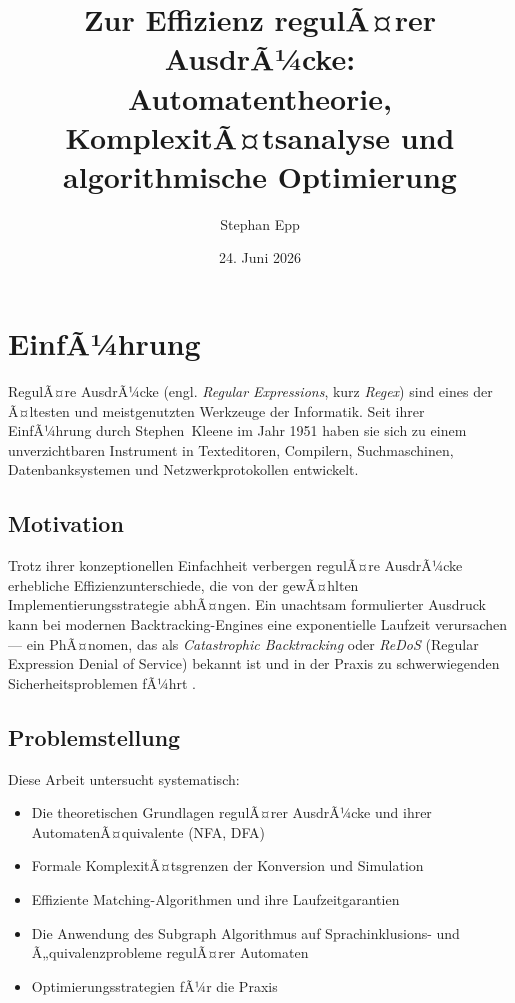 ﻿\documentclass[a4paper,12pt]{article}
\title{Zur Effizienz regulÃ¤rer AusdrÃ¼cke:\\
Automatentheorie, KomplexitÃ¤tsanalyse und\\
algorithmische Optimierung}
\author{Stephan Epp}
\date{24. Juni 2026}
\theoremstyle{definition}
\begin{document}
\maketitle
\tableofcontents
\newpage

\section{EinfÃ¼hrung}

RegulÃ¤re AusdrÃ¼cke (engl. \emph{Regular Expressions}, kurz \emph{Regex}) sind
eines der Ã¤ltesten und meistgenutzten Werkzeuge der Informatik. Seit ihrer
EinfÃ¼hrung durch Stephen~Kleene im Jahr 1951 \cite{kleene1951} haben sie sich zu
einem unverzichtbaren Instrument in Texteditoren, Compilern, Suchmaschinen,
Datenbanksystemen und Netzwerkprotokollen entwickelt.

\subsection{Motivation}

Trotz ihrer konzeptionellen Einfachheit verbergen regulÃ¤re AusdrÃ¼cke erhebliche
Effizienzunterschiede, die von der gewÃ¤hlten Implementierungsstrategie abhÃ¤ngen.
Ein unachtsam formulierter Ausdruck kann bei modernen Backtracking-Engines eine
exponentielle Laufzeit verursachen --- ein PhÃ¤nomen, das als
\emph{Catastrophic Backtracking} oder \emph{ReDoS} (Regular Expression
Denial of Service) bekannt ist und in der Praxis zu schwerwiegenden
Sicherheitsproblemen fÃ¼hrt \cite{shen2018}.

\subsection{Problemstellung}

Diese Arbeit untersucht systematisch:

\begin{itemize}
	\item Die theoretischen Grundlagen regulÃ¤rer AusdrÃ¼cke und ihrer
	      AutomatenÃ¤quivalente (NFA, DFA)
	\item Formale KomplexitÃ¤tsgrenzen der Konversion und Simulation
	\item Effiziente Matching-Algorithmen und ihre Laufzeitgarantien
	\item Die Anwendung des Subgraph Algorithmus auf Sprachinklusions- und
	      Ã„quivalenzprobleme regulÃ¤rer Automaten
	\item Optimierungsstrategien fÃ¼r die Praxis
\end{itemize}
\end{document}
